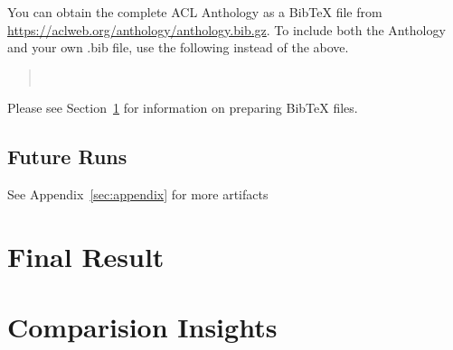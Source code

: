 \documentclass[9pt]{article}
\begin{document}
You can obtain the complete ACL Anthology as a Bib\TeX{} file from \url{https://aclweb.org/anthology/anthology.bib.gz}.
To include both the Anthology and your own .bib file, use the following instead of the above.
\begin{quote}
\begin{verbatim}


\end{verbatim}
\end{quote}

Please see Section~\ref{sec:bibtex} for information on preparing Bib\TeX{} files.

\subsection{Future Runs}

See Appendix~\ref{sec:appendix} for more artifacts

\section{Final Result}
\label{sec:bibtex}


\section{Comparision Insights}
\end{document}
